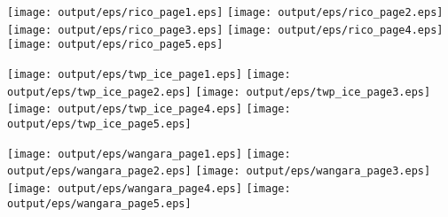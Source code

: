 \documentclass[11pt]{article}
\begin{document}
\begin{center}

\texttt{[image: output/eps/rico\_page1.eps]}
\texttt{[image: output/eps/rico\_page2.eps]}
\texttt{[image: output/eps/rico\_page3.eps]}
\texttt{[image: output/eps/rico\_page4.eps]}
\texttt{[image: output/eps/rico\_page5.eps]}
\end{center}
\newpage

\begin{center}

\texttt{[image: output/eps/twp\_ice\_page1.eps]}
\texttt{[image: output/eps/twp\_ice\_page2.eps]}
\texttt{[image: output/eps/twp\_ice\_page3.eps]}
\texttt{[image: output/eps/twp\_ice\_page4.eps]}
\texttt{[image: output/eps/twp\_ice\_page5.eps]}
\end{center}
\newpage

\begin{center}

\texttt{[image: output/eps/wangara\_page1.eps]}
\texttt{[image: output/eps/wangara\_page2.eps]}
\texttt{[image: output/eps/wangara\_page3.eps]}
\texttt{[image: output/eps/wangara\_page4.eps]}
\texttt{[image: output/eps/wangara\_page5.eps]}
\end{center}
\newpage
\end{document}
